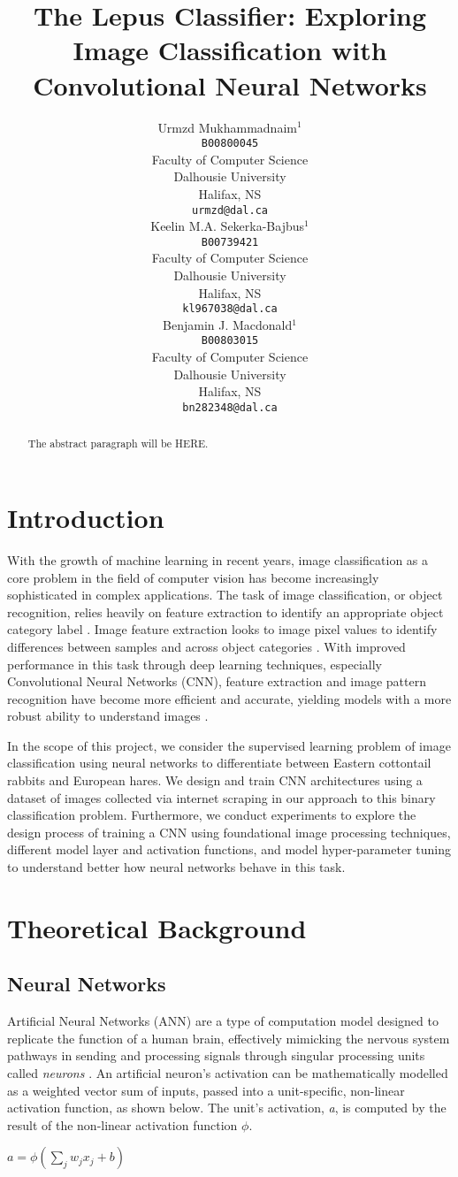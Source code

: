 \documentclass{article}
\title{The Lepus Classifier: Exploring Image Classification with Convolutional Neural Networks}
\author{%
  Urmzd
  Mukhammadnaim$^1$\\
  \texttt{B00800045}\\
  Faculty of Computer Science\\
  Dalhousie University\\
  Halifax, NS  \\
  \texttt{urmzd@dal.ca} \\
  \And
  Keelin M.A.
  Sekerka-Bajbus$^1$\\
  \texttt{B00739421}\\
  Faculty of Computer Science\\
  Dalhousie University\\
  Halifax, NS  \\
  \texttt{kl967038@dal.ca} \\
  \AND
  Benjamin J. Macdonald$^1$ \\
  \texttt{B00803015}\\
  Faculty of Computer Science\\
  Dalhousie University\\
  Halifax, NS  \\
  \texttt{bn282348@dal.ca} \\
}
\begin{document}
\maketitle
\begin{abstract}
  The abstract paragraph will be HERE.
\end{abstract}

\section{Introduction}

With the growth of machine learning in recent years, image classification as a core problem in the field of computer vision has become increasingly sophisticated in complex applications. The task of image classification, or object recognition, relies heavily on feature extraction to identify an appropriate object category label \cite{SHARMA2018377,8078730}. Image feature extraction looks to image pixel values to identify differences between samples and across object categories \cite{SHARMA2018377}. With improved performance in this task through deep learning techniques, especially Convolutional Neural Networks (CNN), feature extraction and image pattern recognition have become more efficient and accurate, yielding models with a more robust ability to understand images \cite{SHARMA2018377,8078730}.

In the scope of this project, we consider the supervised learning problem of image classification using neural networks to differentiate between Eastern cottontail rabbits and European hares. We design and train CNN architectures using a dataset of images collected via internet scraping in our approach to this binary classification problem. Furthermore, we conduct experiments to explore the design process of training a CNN using foundational image processing techniques, different model layer and activation functions, and model hyper-parameter tuning to understand better how neural networks behave in this task.

\section{Theoretical Background}
\subsection{Neural Networks}
Artificial Neural Networks (ANN) are a type of computation model designed to replicate the function of a human brain, effectively mimicking the nervous system pathways in sending and processing signals through singular processing units called \emph{neurons} \cite{gurney1997introduction}. An artificial neuron’s activation can be mathematically modelled as a weighted vector sum of inputs, passed into a unit-specific, non-linear activation function, as shown below. The unit’s activation, \emph{a}, is computed by the result of the non-linear activation function $\phi$.
\newline
\newline
\centerline{$a = \phi(\sum_{j} w_{j}x_{j} + b)$ \cite{grosse2019lecture03}}
\newline
\end{document}
